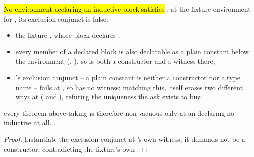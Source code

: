 \begin{theorem}
\label{thm:Vacuity-not_upstreamAsks_natEnv}
\leanok
{}
 \hl{No environment declaring an inductive block satisfies }: at
the fixture environment for , its exclusion conjunct is false.
\begin{itemize}
\item {} the fixture , whose block declares ;
\item every member of a declared block is also declarable as a plain constant below the
environment (, ), so  is both a
constructor and a  witness there;
\item {} 's exclusion conjunct -- a plain constant is neither a
constructor nor a type name -- fails at , so  has no
witness; matching this,  itself erases two different ways at 
( and ), refuting the uniqueness the ask exists to buy.
\end{itemize}
 every theorem above taking  is therefore non-vacuous only
at an  declaring no inductive at all.
 \stProved{}.
\end{theorem}
\begin{proof}
\leanok
{}
 Instantiate the exclusion conjunct at 's own 
witness; it demands  not be a constructor, contradicting the fixture's own
.
\end{proof}

